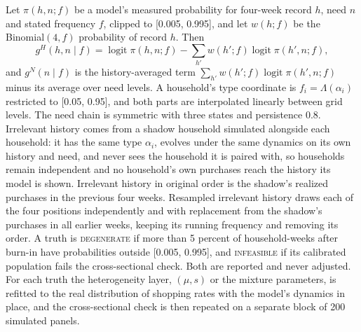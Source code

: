 \documentclass[11pt]{article}
\begin{document}
Let $\pi(h,n;f)$ be a model's measured probability for four-week record $h$, need $n$ and
stated frequency $f$, clipped to [0.005, 0.995], and let $w(h;f)$ be the Binomial$(4,f)$
probability of record $h$. Then
\[
g^H(h,n\mid f)=\operatorname{logit}\pi(h,n;f)-\sum_{h'}w(h';f)\operatorname{logit}\pi(h',n;f),
\]
and $g^N(n\mid f)$ is the history-averaged term $\sum_{h'}w(h';f)\operatorname{logit}\pi(h',n;f)$
minus its average over need levels. A household's type
coordinate is $f_i=\Lambda(\alpha_i)$ restricted to [0.05, 0.95], and both parts are interpolated linearly
between grid levels. The need chain is symmetric with three states and persistence 0.8. Irrelevant history comes from a shadow household simulated alongside each household: it has the
same type $\alpha_i$, evolves under the same dynamics on its own history and need, and never
sees the household it is paired with, so households remain independent and no household's own
purchases reach the history its model is shown. Irrelevant history in original order is the
shadow's realized purchases in the previous four weeks. Resampled irrelevant history draws each
of the four positions independently and with replacement from the shadow's purchases in all
earlier weeks, keeping its running frequency and removing its order. A truth is \textsc{degenerate} if more than 5 percent of
household-weeks after burn-in have probabilities outside [0.005, 0.995], and \textsc{infeasible} if its
calibrated population fails the cross-sectional check. Both are reported and never adjusted.
For each truth the heterogeneity layer, $(\mu,s)$ or the mixture parameters, is refitted to the
real distribution of shopping rates with the model's dynamics in place, and the cross-sectional
check is then repeated on a separate block of 200 simulated panels.
\end{document}
